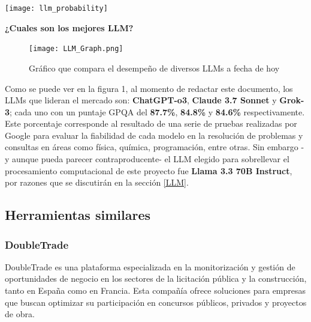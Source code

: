 \documentclass{article}
\begin{document}
\begin{center}
\texttt{[image: llm\_probability]}
\end{center}

\setlength{\parindent}{10pt} %
\textbf{¿Cuales son los mejores LLM?}  \\


\begin{figure}[H] %
\centering
\texttt{[image: LLM\_Graph.png]}
\caption{Gráfico que compara el desempeño de diversos LLMs a fecha de hoy} 
\cite{llm-stats}
\label{tab:LLM_Graph}
\end{figure}

Como se puede ver en la figura 1, al momento de redactar este documento, los LLMs que lideran el mercado son: \textbf{ChatGPT-o3}, \textbf{Claude 3.7 Sonnet} y \textbf{Grok-3}; cada uno con un puntaje GPQA del \textbf{87.7\%}, \textbf{84.8\%} y \textbf{84.6\%} respectivamente. Este porcentaje corresponde al resultado de una serie de pruebas realizadas por Google para evaluar la fiabilidad de cada modelo en la resolución de problemas y consultas en áreas como física, química, programación, entre otras.
Sin embargo -y aunque pueda parecer contraproducente- el LLM elegido para sobrellevar el procesamiento computacional de este proyecto fue \textbf{Llama 3.3 70B Instruct}, por razones que se discutirán en la sección \ref{LLM}.

\newpage

\subsection{Herramientas similares} 
  \subsubsection{DoubleTrade}
  DoubleTrade es una plataforma especializada en la monitorización y gestión de oportunidades de negocio en los sectores de la licitación pública y la construcción, tanto en España como en Francia. Esta compañía ofrece soluciones para empresas que buscan optimizar su participación en concursos públicos, privados y proyectos de obra.
\end{document}
